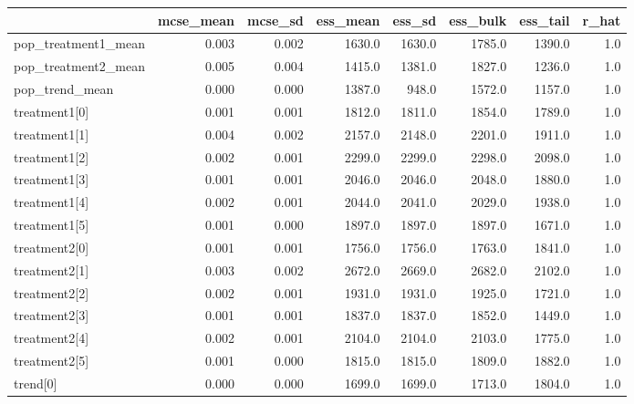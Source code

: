 \begin{tabular}{lrrrrrrr}
\toprule
{} &  mcse\_mean &  mcse\_sd &  ess\_mean &  ess\_sd &  ess\_bulk &  ess\_tail &  r\_hat \\
\midrule
pop\_treatment1\_mean        &      0.003 &    0.002 &    1630.0 &  1630.0 &    1785.0 &    1390.0 &    1.0 \\
pop\_treatment2\_mean        &      0.005 &    0.004 &    1415.0 &  1381.0 &    1827.0 &    1236.0 &    1.0 \\
pop\_trend\_mean             &      0.000 &    0.000 &    1387.0 &   948.0 &    1572.0 &    1157.0 &    1.0 \\
treatment1[0]              &      0.001 &    0.001 &    1812.0 &  1811.0 &    1854.0 &    1789.0 &    1.0 \\
treatment1[1]              &      0.004 &    0.002 &    2157.0 &  2148.0 &    2201.0 &    1911.0 &    1.0 \\
treatment1[2]              &      0.002 &    0.001 &    2299.0 &  2299.0 &    2298.0 &    2098.0 &    1.0 \\
treatment1[3]              &      0.001 &    0.001 &    2046.0 &  2046.0 &    2048.0 &    1880.0 &    1.0 \\
treatment1[4]              &      0.002 &    0.001 &    2044.0 &  2041.0 &    2029.0 &    1938.0 &    1.0 \\
treatment1[5]              &      0.001 &    0.000 &    1897.0 &  1897.0 &    1897.0 &    1671.0 &    1.0 \\
treatment2[0]              &      0.001 &    0.001 &    1756.0 &  1756.0 &    1763.0 &    1841.0 &    1.0 \\
treatment2[1]              &      0.003 &    0.002 &    2672.0 &  2669.0 &    2682.0 &    2102.0 &    1.0 \\
treatment2[2]              &      0.002 &    0.001 &    1931.0 &  1931.0 &    1925.0 &    1721.0 &    1.0 \\
treatment2[3]              &      0.001 &    0.001 &    1837.0 &  1837.0 &    1852.0 &    1449.0 &    1.0 \\
treatment2[4]              &      0.002 &    0.001 &    2104.0 &  2104.0 &    2103.0 &    1775.0 &    1.0 \\
treatment2[5]              &      0.001 &    0.000 &    1815.0 &  1815.0 &    1809.0 &    1882.0 &    1.0 \\
trend[0]                   &      0.000 &    0.000 &    1699.0 &  1699.0 &    1713.0 &    1804.0 &    1.0 \\

\end{tabular}
